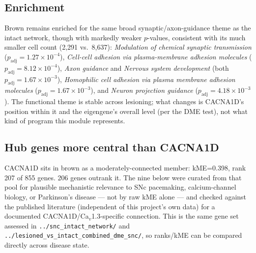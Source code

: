 \documentclass[11pt]{article}
\begin{document}
\subsection*{Enrichment}

Brown remains enriched for the same broad synaptic/axon-guidance theme as
the intact network, though with markedly weaker $p$-values, consistent with
its much smaller cell count (2{,}291 vs.\ 8{,}637): \emph{Modulation of
chemical synaptic transmission} ($p_{\mathrm{adj}}=1.27\times10^{-4}$),
\emph{Cell-cell adhesion via plasma-membrane adhesion molecules}
($p_{\mathrm{adj}}=8.12\times10^{-4}$), \emph{Axon guidance} and
\emph{Nervous system development} (both $p_{\mathrm{adj}}=1.67\times10^{-3}$),
\emph{Homophilic cell adhesion via plasma membrane adhesion molecules}
($p_{\mathrm{adj}}=1.67\times10^{-3}$), and \emph{Neuron projection
guidance} ($p_{\mathrm{adj}}=4.18\times10^{-3}$). The functional theme is
stable across lesioning; what changes is CACNA1D's position within it and
the eigengene's overall level (per the DME test), not what kind of program
this module represents.

\subsection*{Hub genes more central than CACNA1D}

CACNA1D sits in brown as a moderately-connected member: kME=0.398, rank 207
of 855 genes. 206 genes outrank it. The nine below were curated from that
pool for plausible mechanistic relevance to SNc pacemaking, calcium-channel
biology, or Parkinson's disease --- not by raw kME alone --- and checked
against the published literature (independent of this project's own data)
for a documented CACNA1D/Ca$_v$1.3-specific connection. This is the same
gene set assessed in \texttt{../snc\_intact\_network/} and
\texttt{../lesioned\_vs\_intact\_combined\_dme\_snc/}, so ranks/kME can be
compared directly across disease state.
\end{document}
